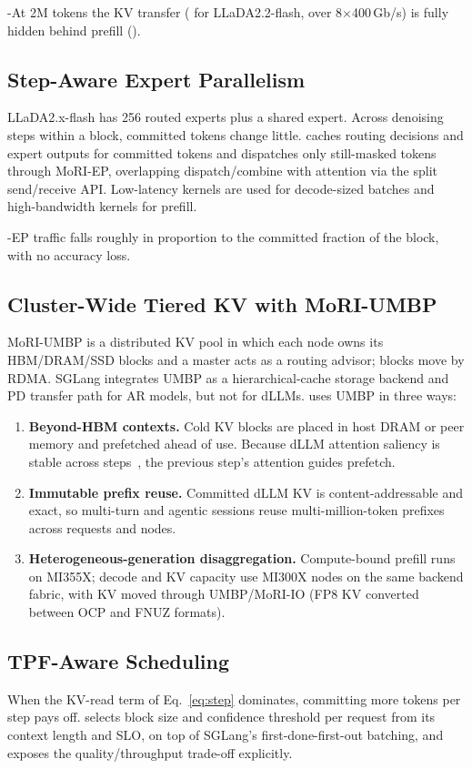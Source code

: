 \hyp{At 2M tokens the KV transfer ( for LLaDA2.2-flash, 
over 8$\times$400\,Gb/s) is fully hidden behind prefill ().}

\subsection{Step-Aware Expert Parallelism}
\label{sec:design-ep}
LLaDA2.x-flash has 256 routed experts plus a shared expert. Across denoising steps within a block,
committed tokens change little. \sys caches routing decisions and expert outputs for committed tokens
and dispatches only still-masked tokens through MoRI-EP, overlapping dispatch/combine with attention
via the split send/receive API. Low-latency kernels are used for decode-sized batches and
high-bandwidth kernels for prefill.

\hyp{EP traffic falls roughly in proportion to the committed fraction of the block, with no accuracy
loss.} 

\subsection{Cluster-Wide Tiered KV with MoRI-UMBP}
\label{sec:design-umbp}
MoRI-UMBP is a distributed KV pool in which each node owns its HBM/DRAM/SSD blocks and a master acts
as a routing advisor; blocks move by RDMA. SGLang integrates UMBP as a hierarchical-cache storage
backend and PD transfer path for AR models, but not for dLLMs. \sys uses UMBP in three ways:
\begin{enumerate}
  \item \textbf{Beyond-HBM contexts.} Cold KV blocks are placed in host DRAM or peer memory and
  prefetched ahead of use. Because dLLM attention saliency is stable across
  steps~\cite{song2025sparsedllm}, the previous step's attention guides prefetch.
  \item \textbf{Immutable prefix reuse.} Committed dLLM KV is content-addressable and exact, so
  multi-turn and agentic sessions reuse multi-million-token prefixes across requests and nodes.
  \item \textbf{Heterogeneous-generation disaggregation.} Compute-bound prefill runs on MI355X; decode
  and KV capacity use MI300X nodes on the same backend fabric, with KV moved through UMBP/MoRI-IO
  (FP8 KV converted between OCP and FNUZ formats).
\end{enumerate}

\subsection{TPF-Aware Scheduling}
\label{sec:design-sched}
When the KV-read term of Eq.~\ref{eq:step} dominates, committing more tokens per step pays off.
\sys selects block size and confidence threshold per request from its context length and SLO, on top
of SGLang's first-done-first-out batching, and exposes the quality/throughput trade-off explicitly.
